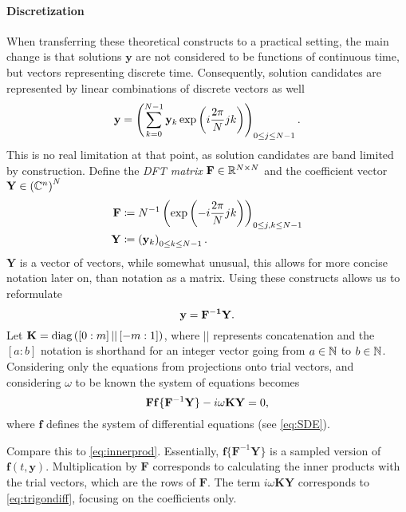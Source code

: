 \paragraph{Discretization} When transferring these theoretical constructs to a practical setting, the main change is that solutions $\mathbf{y}$ are not considered to be functions of continuous time, but vectors representing discrete time.
Consequently, solution candidates are represented by linear combinations of discrete vectors as well
	\[
		\mathbf{\mathbf{y}} = \left( \sum_{k=0}^{N-1} \mathbf{y}_k \exp\left(i \frac{2\pi}{N} j k\right) \right)_{0 \le j \le N-1} \text.
	\]
This is no real limitation at that point, as solution candidates are band limited by construction.
Define the \emph{DFT matrix} $\mathbf F \in \mathbb{R}^{N \times N}$ and the coefficient vector $\mathbf Y \in \left(\mathbb{C}^n\right)^N$
	\begin{align*}
		\mathbf{F} &\coloneqq N^{-1} \left( \exp\left(-i \frac{2\pi}{N} j k \right) \right)_{0 \le j,k \le N-1} \\
		\mathbf{Y} &\coloneqq \left(\mathbf{y}_k\right)_{0 \le k \le N-1} \text.
	\end{align*}
$\mathbf Y$ is a vector of vectors, while somewhat unusual, this allows for more concise notation later on, than notation as a matrix.
Using these constructs allows us to reformulate
	\[
			\mathbf{y} = \mathbf{F^{-1}} \mathbf{Y} \text.
	\]
Let $\mathbf K = \operatorname{diag}\left( [0:m]\, ||\, [-m:1] \right)$, where $||$ represents concatenation and the $[a:b]$ notation is shorthand for an integer vector going from $a \in \mathbb{N}$ to $b \in \mathbb{N}$.
Considering only the equations from projections onto trial vectors, and considering $\omega$ to be known the system of equations becomes %
	\[
		\mathbf{F} \mathbf{f}\{\mathbf F^{-1} \mathbf{Y}\} - i \omega \mathbf K \mathbf Y = 0\text,
	\]
where $\mathbf{f}$ defines the system of differential equations (see \autoref{eq:SDE}).

Compare this to \autoref{eq:innerprod}.
Essentially, $\mathbf{f}\{\mathbf F^{-1} \mathbf{Y}\}$ is a sampled version of $\mathbf f(t,\mathbf y)$.
Multiplication by $\mathbf F$ corresponds to calculating the inner products with the trial vectors, which are the rows of $\mathbf F$.
The term $i \omega \mathbf K \mathbf Y$ corresponds to \autoref{eq:trigondiff}, focusing on the coefficients only.

